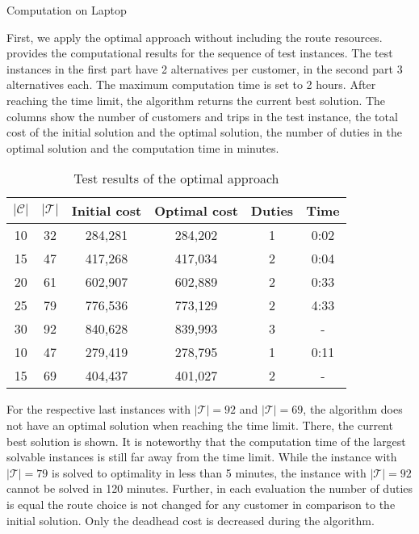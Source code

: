 Computation on Laptop

First, we apply the optimal approach without including the route resources.  provides the computational results for the sequence of test instances. The test instances in the first part have 2 alternatives per customer, in the second part 3 alternatives each. The maximum computation time is set to 2 hours. After reaching the time limit, the algorithm returns the current best solution. The columns show the number of customers and trips in the test instance, the total cost of the initial solution and the optimal solution, the number of duties in the optimal solution and the computation time in minutes.

\begin{table}[htb]
	\centering
	\begin{tabular}{cccccc}
		\toprule
		$\vert\mathcal{C}\vert$ & $\vert\mathcal{T}\vert$ & Initial cost & Optimal cost & Duties & Time \\
		\midrule
		10 & 32 & 284,281 & 284,202 & 1 & 0:02 \\
		15 & 47 & 417,268 & 417,034 & 2 & 0:04 \\
		20 & 61 & 602,907 & 602,889 & 2 & 0:33 \\
		25 & 79 & 776,536 & 773,129 & 2 & 4:33 \\
		30 & 92 & 840,628 & 839,993 & 3 &  - \\
		\midrule
		10 & 47 & 279,419 & 278,795 & 1 & 0:11 \\
		15 & 69 & 404,437 & 401,027 & 2 &  -   \\
		\bottomrule
	\end{tabular}
	\caption{Test results of the optimal approach}
	\label{tab:results:optimal}
\end{table}
		
For the respective last instances with ${\vert\mathcal{T}\vert=92}$ and ${\vert\mathcal{T}\vert=69}$, the algorithm does not have an optimal solution when reaching the time limit. There, the current best solution is shown. It is noteworthy that the computation time of the largest solvable instances is still far away from the time limit. While the instance with ${\vert\mathcal{T}\vert=79}$ is solved to optimality in less than 5 minutes, the instance with ${\vert\mathcal{T}\vert=92}$ cannot be solved in 120 minutes. Further, in each evaluation the number of duties is equal the route choice is not changed for any customer in comparison to the initial solution. Only the deadhead cost is decreased during the algorithm.

